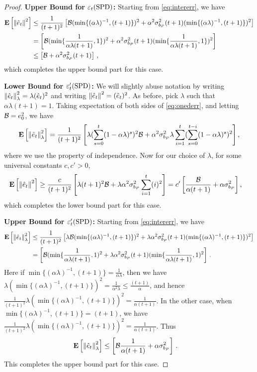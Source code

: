 \begin{proof}
\textbf{Upper Bound for $\varepsilon_t(\mathrm{SPD})$:}
Starting from \eqref{eq:intererr}, we have
\begin{align}
\mathbf{E}\left[\left\| \hat{e}_t\right\|^2\right]
&\leq \frac{1}{(t+1)^2}\left[\mathcal{B} (\min\{(\alpha\lambda)^{-1},(t+1)\})^2+ \alpha^2 \sigma^2_{b_P} (t+1) (\min\{(\alpha\lambda)^{-1},(t+1)\})^2 \right]\\
&= \left[\mathcal{B} (\min\{\frac{1}{\alpha \lambda (t+1)},1\})^2
		+ \alpha^2 \sigma^2_{b_P} (t+1) (\min\{\frac{1}{\alpha \lambda (t+1)},1\})^2 \right]\\
&\leq \left[\mathcal{B} + \alpha^2 \sigma^2_{b_P} (t+1) \right]\,, 
\end{align}
which completes the upper bound part for this case.

\textbf{Lower Bound for $\varepsilon_t'(\mathrm{SPD})$:}
We will slightly abuse notation by writing $\left\| \hat{e}_t\right\|^2_{\lambda} = \lambda (\hat{e}_t)^2$
and writing $\left\| \hat{e}_t\right\|^2 = (\hat{e}_t)^2$.
As before, pick $\lambda$ such that $\alpha \lambda (t+1)=1$. Taking expectation of both sides of \eqref{eq:onederr}, and letting $\mathcal{B}=e_0^2$, we have
\begin{align}\label{eq:intererr}
\mathbf{E}\left[\left\| \hat{e}_t\right\|^2_{\lambda}\right]=\frac{1}{(t+1)^2}\left[ \lambda (\sum_{s=0}^t(1-\alpha \lambda)^s)^2 \mathcal{B}+ \alpha^2\sigma^2_{b_P}\lambda \sum_{i=1}^t (\sum_{s=0}^{t-i} (1-\alpha \lambda)^s)^2\right],
\end{align}
where we use the property of independence. Now for our choice of $\lambda$, for some universal constants $c,c'>0$,
\begin{align}
\mathbf{E}\left[\left\| \hat{e}_t\right\|^2\right]&\geq \frac{c}{(t+1)^2}\left[ \lambda (t+1)^2 \mathcal{B}+ \lambda \alpha^2\sigma^2_{b_P} \sum_{i=1}^t (i)^2\right]
= c' \left[\frac{\mathcal{B}}{\alpha (t+1)}+ \alpha  \sigma^2_{b_P} \right],
\end{align}
which completes the lower bound part for this case.

\textbf{Upper Bound for $\varepsilon_t'(\mathrm{SPD})$:}
Starting from \eqref{eq:intererr}, we have
\begin{align}
\mathbf{E}\left[\left\| \hat{e}_t\right\|^2_{\lambda}\right]&\leq \frac{1}{(t+1)^2}\left[\lambda \mathcal{B} (\min\{(\alpha\lambda)^{-1},(t+1)\})^2+ \lambda \alpha^2 \sigma^2_{b_P} (t+1) (\min\{(\alpha\lambda)^{-1},(t+1)\})^2 \right]\\
&= \left[\mathcal{B} (\min\{\frac{1}{\alpha \lambda (t+1)},1)^2+ \lambda \alpha^2 \sigma^2_{b_P} (t+1) (\min\{\frac{1}{\alpha \lambda (t+1)},1)^2 \right]\,.
\end{align}
Here if $\min\{(\alpha\lambda)^{-1},(t+1)\}=\frac{1}{\alpha \lambda}$, then we have $\lambda(\min\{(\alpha\lambda)^{-1},(t+1)\})^2=\frac{1}{\alpha^2 \lambda}\leq \frac{(t+1)}{\alpha}$, and hence $\frac{1}{(t+1)^2}\lambda(\min\{(\alpha\lambda)^{-1},(t+1)\})^2=\frac{1}{\alpha (t+1)}$. In the other case, when $\min\{(\alpha\lambda)^{-1},(t+1)\}=(t+1)$, we have
$\frac{1}{(t+1)^2}\lambda(\min\{(\alpha\lambda)^{-1},(t+1)\})^2=\frac{1}{\alpha (t+1)}$. Thus
\begin{align}
\mathbf{E}\left[\left\| \hat{e}_t\right\|^2_{\lambda}\right]&\leq \left[\mathcal{B} \frac{1}{\alpha (t+1)}+ \alpha \sigma^2_{b_P} \right]\,.
\end{align}
This completes the upper bound part for this case.


\end{proof}
